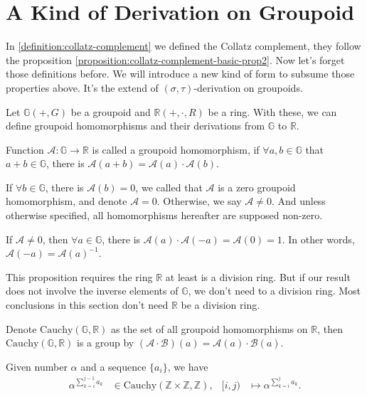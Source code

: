 \section{A Kind of Derivation on Groupoid}\label{sec:a-kind-of-derivation-on-groupoid}
In \cref{definition:collatz-complement} we defined the Collatz complement, they follow the proposition \cref{proposition:collatz-complement-basic-prop2}.
Now let's forget those definitions before.
We will introduce a new kind of form to subsume those properties above. It's the extend of $(\sigma, \tau)$-derivation on groupoids.

Let $\mathbb{G}(+, G)$ be a groupoid and $\mathbb{R}(+, \cdot, R)$ be a ring.
With these, we can define groupoid homomorphisms and their derivations from $\mathbb{G}$ to $\mathbb{R}$.
\begin{definition}
    Function $\mathcal{A}: \mathbb{G} \to \mathbb{R}$ is called a groupoid homomorphism, if $\forall a, b \in \mathbb{G}$ that $a + b \in \mathbb{G}$, there is $\mathcal{A}(a+b) = \mathcal{A}(a) \cdot \mathcal{A}(b)$.
\end{definition}
If $\forall b \in \mathbb{G}$, there is $\mathcal{A}(b) = 0$, we called that $\mathcal{A}$ is a zero groupoid homomorphism, and denote $\mathcal{A} = 0$.
Otherwise, we say $\mathcal{A} \ne 0$. And unless otherwise specified, all homomorphisms hereafter are supposed non-zero.
\begin{proposition}
    If $\mathcal{A} \ne 0$, then $\forall a \in \mathbb{G}$, there is $\mathcal{A}(a)\cdot\mathcal{A}(-a) = \mathcal{A}(0) = 1$. In other words, $\mathcal{A}(-a) = \mathcal{A}(a)^{-1}$.
\end{proposition}
\begin{remark}
    This proposition requires the ring $\mathbb{R}$ at least is a division ring. But if our result does not involve the inverse elements of $\mathbb{G}$, we don't need to a division ring. Most conclusions in this section don't need $\mathbb{R}$ be a division ring. 
\end{remark}
\begin{proposition}
    Denote $\mathrm{Cauchy}(\mathbb{G},\mathbb{R})$ as the set of all groupoid homomorphisms on $\mathbb{R}$, then $\mathrm{Cauchy}(\mathbb{G},\mathbb{R})$ is a group by $(\mathcal{A}\cdot\mathcal{B})(a) = \mathcal{A}(a)\cdot\mathcal{B}(a)$.
\end{proposition}
\begin{example}\label{exa:power-to-cauchy-homo}
    Given number $\alpha$ and a sequence $\{a_i\}$, we have
    \begin{align*}
        \alpha^{\sum_{k=i}^{j-1}a_k}&\in \mathrm{Cauchy}(\mathbb{Z}\times \mathbb{Z}, \mathbb{Z}), & [i, j) &\mapsto \alpha^{\sum_{k=i}^{j}a_k}.
    \end{align*}
\end{example}
